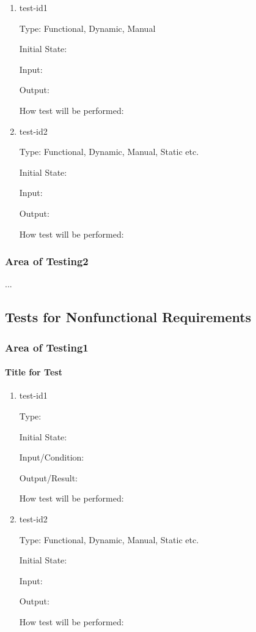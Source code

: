 \documentclass[12pt, titlepage]{article}
\begin{document}
\begin{enumerate}

\item{test-id1\\}

Type: Functional, Dynamic, Manual
					
Initial State: 
					
Input: 
					
Output: 
					
How test will be performed: 
					
\item{test-id2\\}

Type: Functional, Dynamic, Manual, Static etc.
					
Initial State: 
					
Input: 
					
Output: 
					
How test will be performed: 

\end{enumerate}

\subsubsection{Area of Testing2}

...

\subsection{Tests for Nonfunctional Requirements}

\subsubsection{Area of Testing1}
		
\paragraph{Title for Test}

\begin{enumerate}

\item{test-id1\\}

Type: 
					
Initial State: 
					
Input/Condition: 
					
Output/Result: 
					
How test will be performed: 
					
\item{test-id2\\}

Type: Functional, Dynamic, Manual, Static etc.
					
Initial State: 
					
Input: 
					
Output: 
					
How test will be performed: 

\end{enumerate}
\end{document}
